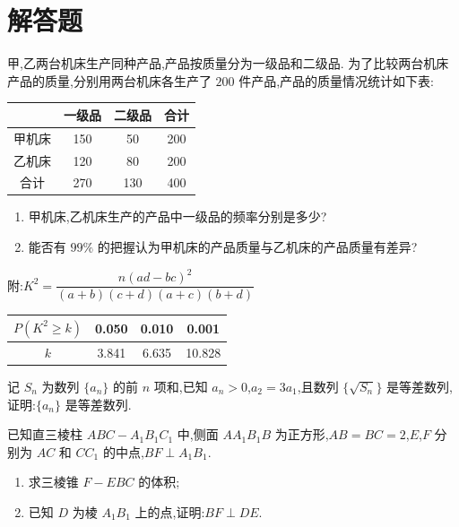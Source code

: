 \section{解答题}

\begin{problem}
甲,乙两台机床生产同种产品,产品按质量分为一级品和二级品. 为了比较两台机床产品的质量,分别用两台机床各生产了 \(200\) 件产品,产品的质量情况统计如下表:

\begin{center}
\begin{tabular}{|c|c|c|c|}
\hline
 & 一级品 & 二级品 & 合计 \\
\hline
甲机床 & 150 & 50 & 200 \\
\hline
乙机床 & 120 & 80 & 200 \\
\hline
合计 & 270 & 130 & 400 \\
\hline
\end{tabular}
\end{center}

\begin{enumerate}
\item 甲机床,乙机床生产的产品中一级品的频率分别是多少?
\item 能否有 \(99\%\) 的把握认为甲机床的产品质量与乙机床的产品质量有差异?
\end{enumerate}

附:\(K^2=\dfrac{n(ad-bc)^2}{(a+b)(c+d)(a+c)(b+d)}\)

\begin{center}
\begin{tabular}{|c|c|c|c|}
\hline
\(P(K^2\ge k)\) & 0.050 & 0.010 & 0.001 \\
\hline
\(k\) & 3.841 & 6.635 & 10.828 \\
\hline
\end{tabular}
\end{center}
\end{problem}


\begin{problem}
记 \(S_n\) 为数列 \(\{a_n\}\) 的前 \(n\) 项和,已知 \(a_n>0\),\(a_2=3a_1\),且数列 \(\{\sqrt{S_n}\}\) 是等差数列,证明:\(\{a_n\}\) 是等差数列.
\end{problem}


\begin{problem}
已知直三棱柱 \(ABC-A_1B_1C_1\) 中,侧面 \(AA_1B_1B\) 为正方形,\(AB=BC=2\),\(E\),\(F\) 分别为 \(AC\) 和 \(CC_1\) 的中点,\(BF\perp A_1B_1\).

\begin{enumerate}
\item 求三棱锥 \(F-EBC\) 的体积;
\item 已知 \(D\) 为棱 \(A_1B_1\) 上的点,证明:\(BF\perp DE\).
\end{enumerate}

\end{problem}


